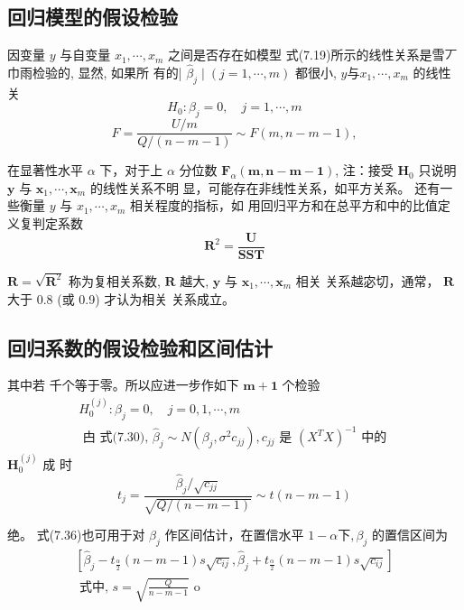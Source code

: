 \subsection{回归模型的假设检验}

因变量 \( y \) 与自变量 \( x_{1}, \cdots, x_{m} \) 之间是否存在如模型 式(7.19)所示的线性关系是雪丆巾雨检验的, 显然, 如果所 有的| \( \hat{\beta}_{j} \mid(j=1, \cdots, m) \) 都很小, \( y 与 x_{1}, \cdots, x_{m} \) 的线性关
$$
H_{0}: \beta_{j}=0, \quad j=1, \cdots, m
$$
$$
F=\frac{U / m}{Q /(n-m-1)} \sim F(m, n-m-1),
$$

在显著性水平 \( \alpha \) 下，对于上 \( \alpha \) 分位数 \( \boldsymbol{F}_{\alpha}(\boldsymbol{m}, \boldsymbol{n}-\boldsymbol{m}-\mathbf{1}) \),
注：接受 \( \boldsymbol{H}_{0} \) 只说明 \( \boldsymbol{y} \) 与 \( \boldsymbol{x}_{1}, \cdots, \boldsymbol{x}_{m} \) 的线性关系不明
显，可能存在非线性关系，如平方关系。 还有一些衡量 \( y \) 与 \( x_{1}, \cdots, x_{m} \) 相关程度的指标，如 用回归平方和在总平方和中的比值定义复判定系数
$$
\boldsymbol{R}^{2}=\frac{\boldsymbol{U}}{\boldsymbol{S S T}}
$$

\( \boldsymbol{R}=\sqrt{\boldsymbol{R}^{2}} \) 称为复相关系数, \( \boldsymbol{R} \) 越大, \( \boldsymbol{y} \) 与 \( \boldsymbol{x}_{1}, \cdots, \boldsymbol{x}_{m} \) 相关
关系越宓切，通常， \( \boldsymbol{R} \) 大于 \( 0.8 \) (或 0.9) 才认为相关
关系成立。

\subsection{回归系数的假设检验和区间估计}

其中若 千个等于零。所以应进一步作如下 \( \boldsymbol{m}+\mathbf{1} \) 个检验
$$
\begin{array}{l}
H_{0}^{(j)}: \beta_{j}=0, \quad j=0,1, \cdots, m \\
\text { 甴 式(7.30), } \hat{\beta}_{j} \sim N\left(\beta_{j}, \sigma^{2} c_{j j}\right), c_{j j} \text { 是 }\left(X^{T} X\right)^{-1} \text { 中的 }
\end{array}
$$
\( \boldsymbol{H}_{0}^{(j)} \) 成 时
$$
t_{j}=\frac{\hat{\beta}_{j} / \sqrt{c_{j j}}}{\sqrt{Q /(n-m-1)}} \sim t(n-m-1)
$$

绝。 式(7.36)也可用于对 \( \beta_{j} \) 作区间估计，在置信水平 \( 1-\alpha 下, \beta_{j} \) 的置信区间为
$$
\begin{array}{l}
{\left[\hat{\beta}_{j}-t_{\frac{\alpha}{2}}(n-m-1) s \sqrt{c_{i j}}, \hat{\beta}_{j}+t_{\frac{\alpha}{2}}(n-m-1) s \sqrt{c_{i j}}\right]} \\
\text { 式中, } s=\sqrt{\frac{Q}{n-m-1}} \text { o }
\end{array}
$$

